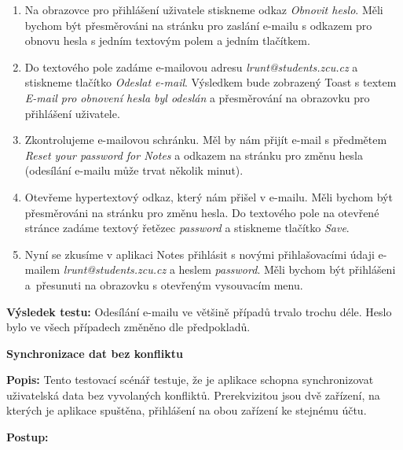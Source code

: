 \documentclass[czech, bc, kiv, he, iso690numb]{fasthesis}
\begin{document}
\begin{enumerate}[label=\arabic*., itemsep=0pt, topsep=0pt, parsep=0pt]
    \item Na obrazovce pro přihlášení uživatele stiskneme odkaz \textit{Obnovit heslo}. Měli bychom být přesměrováni na stránku pro zaslání e-mailu s odkazem pro obnovu hesla s jedním textovým polem a jedním tlačítkem.
    \item Do textového pole zadáme e-mailovou adresu \textit{lrunt@students.zcu.cz} a stiskneme tlačítko \textit{Odeslat e-mail}. Výsledkem bude zobrazený Toast s textem \textit{E-mail pro obnovení hesla byl odeslán} a přesměrování na obrazovku pro přihlášení uživatele. 
    \item Zkontrolujeme e-mailovou schránku. Měl by nám přijít e-mail s předmětem \textit{Reset your password for Notes} a odkazem na stránku pro změnu hesla (odesílání e-mailu může trvat několik minut). 
    \item Otevřeme hypertextový odkaz, který nám přišel v e-mailu. Měli bychom být přesměrováni na stránku pro změnu hesla. Do textového pole na otevřené stránce zadáme textový řetězec \textit{password} a stiskneme tlačítko \textit{Save}.
    \item Nyní se zkusíme v aplikaci Notes přihlásit s novými přihlašovacími údaji e-mailem \textit{lrunt@students.zcu.cz} a heslem \textit{password}. Měli bychom být přihlášeni a~přesunuti na obrazovku s otevřeným vysouvacím menu.
\end{enumerate}

\noindent \textbf{Výsledek testu:} Odesílání e-mailu ve většině případů trvalo trochu déle. Heslo bylo ve všech případech změněno dle předpokladů.

\vspace{0.1cm}

\newpage

\noindent \textbf{Synchronizace dat bez konfliktu}

\vspace{0.1cm}

\noindent \textbf{Popis:} Tento testovací scénář testuje, že je aplikace schopna synchronizovat uživatelská data bez vyvolaných konfliktů. Prerekvizitou jsou dvě zařízení, na kterých je aplikace spuštěna, přihlášení na obou zařízení ke stejnému účtu.  

\vspace{0.1cm}

\noindent \textbf{Postup:}
\end{document}
